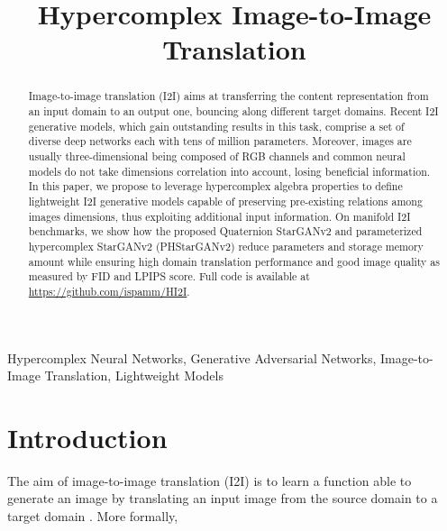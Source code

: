 \documentclass[conference]{IEEEtran}
\begin{document}
\title{Hypercomplex Image-to-Image Translation}

\author{
}

\maketitle

\begin{abstract}
Image-to-image translation (I2I) aims at transferring the content representation from an input domain to an output one, bouncing along different target domains. Recent I2I generative models, which gain outstanding results in this task, comprise a set of diverse deep networks each with tens of million parameters. Moreover, images are usually three-dimensional being composed of RGB channels and common neural models do not take dimensions correlation into account, losing beneficial information. In this paper, we propose to leverage hypercomplex algebra properties to define lightweight I2I generative models capable of preserving pre-existing relations among images dimensions, thus exploiting additional input information. On manifold I2I benchmarks, we show how the proposed Quaternion StarGANv2 and parameterized hypercomplex StarGANv2 (PHStarGANv2) reduce parameters and storage memory amount while ensuring high domain translation performance and good image quality as measured by FID and LPIPS score. Full code is available at \url{https://github.com/ispamm/HI2I}.
\end{abstract}

\begin{IEEEkeywords}
Hypercomplex Neural Networks, Generative Adversarial Networks, Image-to-Image Translation, Lightweight Models
\end{IEEEkeywords}

\section{Introduction}
\label{sec:intro}

The aim of image-to-image translation (I2I) is to learn a function  able to generate an image  by translating an input image  from the source domain  to a target domain . More formally,
\end{document}
